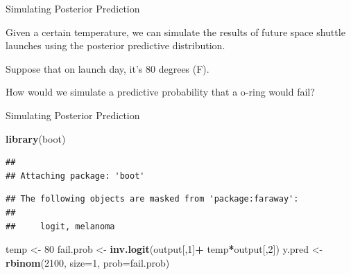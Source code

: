 \documentclass[
  ignorenonframetext,
]{beamer}
\newenvironment{Shaded}{\begin{snugshade}}{\end{snugshade}}
\newcommand{\DataTypeTok}[1]{\textcolor[rgb]{0.13,0.29,0.53}{#1}}
\newcommand{\DecValTok}[1]{\textcolor[rgb]{0.00,0.00,0.81}{#1}}
\newcommand{\KeywordTok}[1]{\textcolor[rgb]{0.13,0.29,0.53}{\textbf{#1}}}
\newcommand{\NormalTok}[1]{#1}
\newcommand{\OperatorTok}[1]{\textcolor[rgb]{0.81,0.36,0.00}{\textbf{#1}}}
\newcommand{\StringTok}[1]{\textcolor[rgb]{0.31,0.60,0.02}{#1}}
\begin{document}
\begin{frame}{Simulating Posterior Prediction}
\protect\hypertarget{simulating-posterior-prediction}{}

Given a certain temperature, we can simulate the results of future space
shuttle launches using the posterior predictive distribution.

Suppose that on launch day, it's 80 degrees (F).

How would we simulate a predictive probability that a o-ring would fail?

\end{frame}

\begin{frame}[fragile]{Simulating Posterior Prediction}
\protect\hypertarget{simulating-posterior-prediction-1}{}

\begin{Shaded}
\begin{Highlighting}[]
\KeywordTok{library}\NormalTok{(boot)}
\end{Highlighting}
\end{Shaded}

\begin{verbatim}
## 
## Attaching package: 'boot'
\end{verbatim}

\begin{verbatim}
## The following objects are masked from 'package:faraway':
## 
##     logit, melanoma
\end{verbatim}

\begin{Shaded}
\begin{Highlighting}[]
\NormalTok{temp <-}\StringTok{ }\DecValTok{80}
\NormalTok{fail.prob <-}\StringTok{ }\KeywordTok{inv.logit}\NormalTok{(output[,}\DecValTok{1}\NormalTok{]}\OperatorTok{+}\StringTok{ }\NormalTok{temp}\OperatorTok{*}\NormalTok{output[,}\DecValTok{2}\NormalTok{])}
\NormalTok{y.pred <-}\StringTok{ }\KeywordTok{rbinom}\NormalTok{(}\DecValTok{2100}\NormalTok{, }\DataTypeTok{size=}\DecValTok{1}\NormalTok{, }\DataTypeTok{prob=}\NormalTok{fail.prob)}
\end{Highlighting}
\end{Shaded}

\end{frame}
\end{document}
